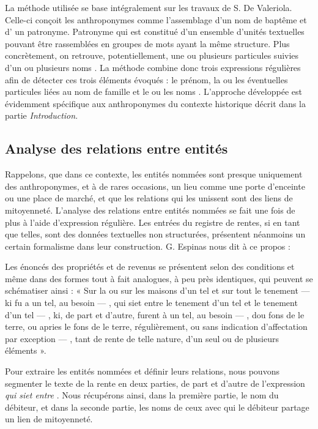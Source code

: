 La méthode utilisée se base intégralement sur les travaux de S. De Valeriola. Celle-ci conçoit les anthroponymes comme l'assemblage d'un  nom de baptême et d' un patronyme. Patronyme qui est constitué d'un ensemble d'unités textuelles  pouvant être rassemblées en  groupes de mots ayant la même structure. Plus concrètement, on retrouve, potentiellement,  une ou plusieurs particules  suivies d'un ou plusieurs \og noms \fg{}. La méthode combine donc trois expressions régulières afin de détecter ces trois éléments évoqués : le prénom, la ou les éventuelles particules liées au nom de famille et le ou les noms \parencite{de_valeriola_lordinateur_2021}. L'approche développée est évidemment spécifique aux anthroponymes du contexte historique décrit dans la partie \textit{Introduction}.

\subsection{Analyse des relations entre entités}
Rappelons, que dans ce contexte, les entités nommées sont presque uniquement des anthroponymes, et à de rares occasions, un lieu comme une porte d'enceinte ou une place de marché, et que les relations qui les unissent sont des liens de mitoyenneté.
L'analyse des relations entre entités nommées se fait une fois de plus à l'aide d'expression régulière. Les entrées du registre de rentes, si en tant que telles, sont des données textuelles non structurées, présentent néanmoins un certain formalisme dans leur construction. G. Espinas nous dit à ce propos : 
\begin{displayquote}
    \og Les énoncés des propriétés et de revenus se présentent selon des conditions et même dans des formes tout à fait analogues, à peu près identiques, qui peuvent se schématiser ainsi : « Sur la ou sur les maisons d’un tel et sur tout le tenement — ki fu a un tel, au besoin — , qui siet entre le tenement d’un tel et le tenement d’un tel — , ki, de part et d’autre, furent à un tel, au besoin — , dou fons de le terre, ou apries le fons de le terre, régulièrement, ou sans indication d’affectation par exception — , tant de rente de telle nature, d’un seul ou de plusieurs éléments ».\fg{}
\end{displayquote} 
\vspace{0,5cm}
Pour extraire les entités nommées et définir leurs relations, nous pouvons segmenter le texte de la rente en deux parties, de part et d'autre de l'expression \og \textit{qui siet entre} \fg{}. Nous récupérons ainsi, dans la première partie, le nom du débiteur, et dans la seconde partie, les noms de ceux avec qui le débiteur partage un lien de mitoyenneté.




